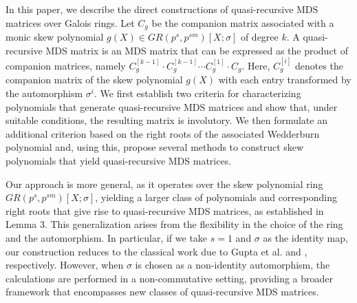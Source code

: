 \documentclass[11pt]{article}
\begin{document}

In this paper, we describe the direct constructions of quasi-recursive MDS matrices over Galois rings. Let \(C_g\) be the companion matrix associated with a monic skew polynomial \(g(X) \in GR(p^s, p^{sm})[X;\sigma]\) of degree \(k\). A quasi-recursive MDS matrix is an MDS matrix that can be expressed as the product of companion matrices, namely \(C_g^{[k-1]} \cdot C_g^{[k-1]} \cdots C_g^{[1]} \cdot C_g\). Here, \(C_g^{[i]}\) denotes the companion matrix of the skew polynomial \(g(X)\) with each entry transformed by the automorphism \(\sigma^i\). We first establish two criteria for characterizing polynomials that generate quasi-recursive MDS matrices and show that, under suitable conditions, the resulting matrix is involutory. We then formulate an additional criterion based on the right roots of the associated Wedderburn polynomial and, using this, propose several methods to construct skew polynomials that yield quasi-recursive MDS matrices.


 
Our approach is more general, as it operates over the skew polynomial ring $GR(p^s, p^{sm})[X;\sigma]$, yielding a larger class of polynomials and corresponding right roots that give rise to quasi-recursive MDS matrices, as established in Lemma 3. This generalization arises from the flexibility in the choice of the ring and the automorphism. In particular, if we take $s = 1$ and $\sigma$ as the identity map, our construction reduces to the classical work due to Gupta et al. \cite[Theorem 1]{Guptadirect} and \cite[Theorem 1]{gupta2017towards}, respectively. However, when $\sigma$ is chosen as a non-identity automorphism, the calculations are performed in a non-commutative setting, providing a broader framework that encompasses new classes of quasi-recursive MDS matrices. 
\end{document}
